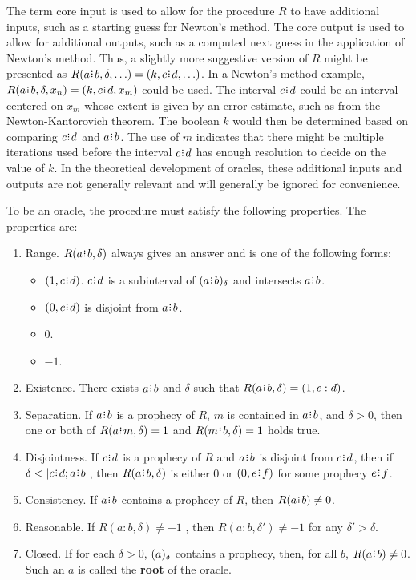 \documentclass[12pt]{article}
\begin{document}
The term core input is used to allow for the procedure $R$ to have additional inputs, such as a starting guess for Newton's method. The core output is used to allow for additional outputs, such as a computed next guess in the application of Newton's method. Thus, a slightly more suggestive version of $R$ might be presented as $R(a \rint b, \delta, \ldots) = (k, c \rint d, \ldots)$. In a Newton's method example, $R(a \rint b, \delta, x_n) = (k, c \rint d, x_m)$ could be used. The interval $c \rint d$ could be an interval centered on $x_m$ whose extent is given by an error estimate, such as from the Newton-Kantorovich theorem. The boolean $k$ would then be determined based on comparing $c \rint d$ and $a \rint b$. The use of $m$ indicates that there might be multiple iterations used before the interval $c \rint d$ has enough resolution to decide on the value of $k$. In the theoretical development of oracles, these additional inputs and outputs are not generally relevant and will generally be ignored for convenience.  

To be an oracle, the procedure must satisfy the following properties.  The properties are:
\begin{enumerate}
    \item Range. $R(a\rint b, \delta)$  always gives an answer and is one of the following forms: 
    \begin{itemize}
        \item $(1, c\rint d)$. $c\rint d$ is a subinterval of $\halo{a\rint b}$ and intersects $a\rint b$. 
        \item $(0, c\rint d)$ is disjoint from $a\rint b$.
        \item $0$. 
        \item $-1$. 
    \end{itemize} 
    \item Existence. There exists $a \rint b$ and $\delta$ such that $R(a \rint b, \delta) = (1, c:d)$. 
    \item Separation. If $a\rint b$ is a prophecy of $R$, $m$ is contained in $a\rint b$, and $\delta > 0$, then one or both of $R(a \rint m, \delta) =1$  and $R(m \rint b, \delta) = 1$ holds true. 
   \item Disjointness. 
   If $c\rint d$ is a prophecy of $R$ and $a\rint b$ is disjoint from $c\rint d$, then if $\delta < |c \rint d; a\rint b|$, then $R(a\rint b, \delta)$ is either $0$ or $(0, e \rint f)$ for some prophecy $e \rint f$.
    \item Consistency. If $a\rint b$ contains a prophecy of $R$, then $R(a\rint b) \neq 0$. 
    \item Reasonable. If $R(a:b, \delta) \neq -1$ , then $R(a:b, \delta') \neq -1$ for any $\delta' > \delta$.
    \item Closed. 
    If for each $\delta >0$, $(a)_{\delta}$ contains a prophecy, then, for all $b$, $R(a\rint b) \neq 0$. Such an $a$ is called the \textbf{root} of the oracle. 
\end{enumerate}
\end{document}
